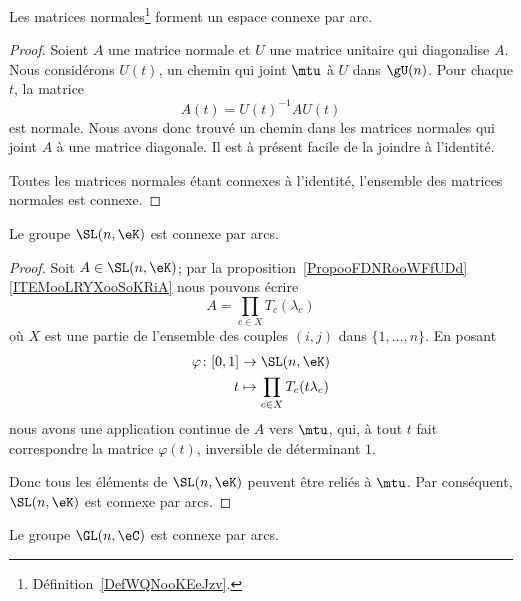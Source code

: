 \begin{theorem}
	Les matrices normales\footnote{Définition~\ref{DefWQNooKEeJzv}.} forment un espace connexe par arc.
\end{theorem}

\begin{proof}
	Soient \( A\) une matrice normale et \( U\) une matrice unitaire qui diagonalise \( A\). Nous considérons \( U(t)\), un chemin qui joint \( \mtu\) à \( U\) dans \( \gU(n)\). Pour chaque \( t\), la matrice
	\begin{equation}
		A(t)=U(t)^{-1} AU(t)
	\end{equation}
	est normale. Nous avons donc trouvé un chemin dans les matrices normales qui joint \( A\) à une matrice diagonale. Il est à présent facile de la joindre à l'identité.

	Toutes les matrices normales étant connexes à l'identité, l'ensemble des matrices normales est connexe.
\end{proof}

\begin{proposition}     \label{PROPooALQCooLZCKrH}
	Le groupe \( \SL(n,\eK)\) est connexe par arcs.
\end{proposition}

\begin{proof}
	Soit \( A\in \SL(n,\eK)\); par la proposition~\ref{PropooFDNRooWFfUDd}\ref{ITEMooLRYXooSoKRiA} nous pouvons écrire
	\begin{equation}
		A=\prod_{c\in X}T_c(\lambda_c)
	\end{equation}
	où \( X\) est une partie de l'ensemble des couples \( (i,j)\) dans \( \{ 1,\ldots, n \}\). En posant
	\begin{equation}
		\begin{aligned}
			\varphi\colon \mathopen[ 0 , 1 \mathclose] & \to \SL(n,\eK)                        \\
			t                                          & \mapsto \prod_{c\in X}T_c(t\lambda_c)
		\end{aligned}
	\end{equation}
	nous avons une application continue de \( A\) vers \( \mtu\), qui, à tout \( t\) fait correspondre la matrice \( \varphi(t)\), inversible de déterminant \( 1\).

	Donc tous les éléments de \( \SL(n,\eK)\) peuvent être reliés à \( \mtu\). Par conséquent, \( \SL(n,\eK)\) est connexe par arcs.
\end{proof}

\begin{proposition}\label{PROPooVJNIooMByUJQ}
	Le groupe \( \GL(n,\eC)\) est connexe par arcs.
\end{proposition}

